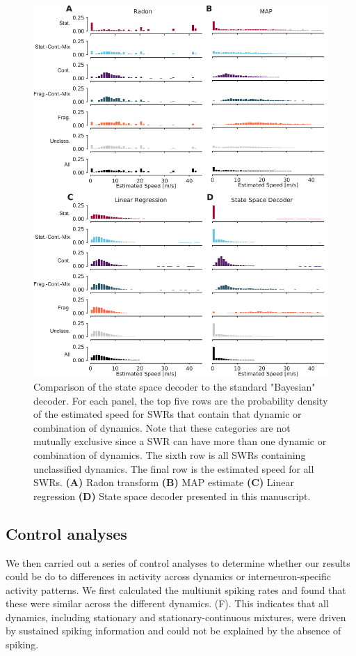 \documentclass[9pt,lineno]{elife}
\begin{document}
\begin{figure}
\includegraphics[width=0.80\linewidth]{figures/Figure6/Figure6_v2}
\caption{
Comparison of the state space decoder to the standard "Bayesian" decoder. For each panel, the top five rows are the probability density of the estimated speed for SWRs that contain that dynamic or combination of dynamics. Note that these categories are not mutually exclusive since a SWR can have more than one dynamic or combination of dynamics. The sixth row is all SWRs containing unclassified dynamics. The final row is the estimated speed for all SWRs. \textbf{(A)} Radon transform  \textbf{(B)} MAP estimate  \textbf{(C)} Linear regression  \textbf{(D)} State space decoder presented in this manuscript.
}
\label{fig:6}

\end{figure}
\subsection*{Control analyses}

We then carried out a series of control analyses to determine whether our results could be do to differences in activity across dynamics or interneuron-specific activity patterns. We first calculated the multiunit spiking rates and found that these were similar across the different dynamics. (F). This indicates that all dynamics, including stationary and stationary-continuous mixtures, were driven by sustained spiking information and could not be explained by the absence of spiking.
\end{document}
